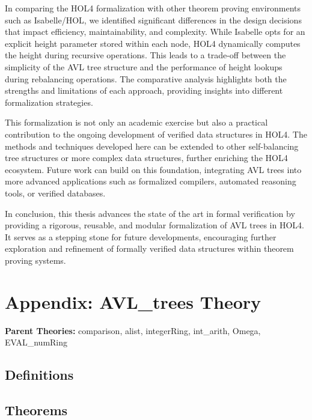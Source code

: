 \documentclass[12pt]{article}
\begin{document}
In comparing the HOL4 formalization with other theorem proving environments such as Isabelle/HOL, we identified significant differences in the design decisions that impact efficiency, maintainability, and complexity. While Isabelle opts for an explicit height parameter stored within each node, HOL4 dynamically computes the height during recursive operations. This leads to a trade-off between the simplicity of the AVL tree structure and the performance of height lookups during rebalancing operations. The comparative analysis highlights both the strengths and limitations of each approach, providing insights into different formalization strategies.

This formalization is not only an academic exercise but also a practical contribution to the ongoing development of verified data structures in HOL4. The methods and techniques developed here can be extended to other self-balancing tree structures or more complex data structures, further enriching the HOL4 ecosystem. Future work can build on this foundation, integrating AVL trees into more advanced applications such as formalized compilers, automated reasoning tools, or verified databases.

In conclusion, this thesis advances the state of the art in formal verification by providing a rigorous, reusable, and modular formalization of AVL trees in HOL4. It serves as a stepping stone for future developments, encouraging further exploration and refinement of formally verified data structures within theorem proving systems.




\section*{Appendix: AVL\_trees Theory}



\begin{flushleft}
\textbf{Parent Theories:} comparison,
alist,
integerRing,
int\_arith,
Omega,
EVAL\_numRing
\end{flushleft}

\subsection{Definitions}

\HOLAVLXXtreesDefinitions

\subsection{Theorems}

\HOLAVLXXtreesTheorems
\end{document}
